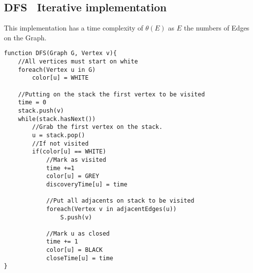 \documentclass[10pt,a4paper]{article}
\begin{document}
\subsection{DFS \textendash\ Iterative implementation}
This implementation has a time complexity of $\theta(E)$ as $E$ the numbers of Edges on the Graph.
\begin{lstlisting}
function DFS(Graph G, Vertex v){
    //All vertices must start on white
    foreach(Vertex u in G)
        color[u] = WHITE

    //Putting on the stack the first vertex to be visited
    time = 0
    stack.push(v)
    while(stack.hasNext())
        //Grab the first vertex on the stack.
        u = stack.pop()
        //If not visited
        if(color[u] == WHITE)
            //Mark as visited            
            time +=1
            color[u] = GREY
            discoveryTime[u] = time
            
            //Put all adjacents on stack to be visited
            foreach(Vertex v in adjacentEdges(u))
                S.push(v)

            //Mark u as closed
            time += 1
            color[u] = BLACK
            closeTime[u] = time
}
\end{lstlisting}
\end{document}
